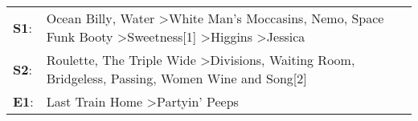 \begin{supertabular}{p{0.03\textwidth}p{0.92\textwidth}}
 \textbf{S1}:  &  Ocean Billy\textsuperscript{}, \enspace Water\textsuperscript{} \textgreater \enspace White Man's Moccasins\textsuperscript{}, \enspace Nemo\textsuperscript{}, \enspace Space Funk Booty\textsuperscript{} \textgreater \enspace Sweetness[1]\textsuperscript{} \textgreater \enspace Higgins\textsuperscript{} \textgreater \enspace Jessica\textsuperscript{}  \enspace  \\
 \textbf{S2}:  &                                                                   Roulette\textsuperscript{}, \enspace The Triple Wide\textsuperscript{} \textgreater \enspace Divisions\textsuperscript{}, \enspace Waiting Room\textsuperscript{}, \enspace Bridgeless\textsuperscript{}, \enspace Passing\textsuperscript{}, \enspace Women Wine and Song[2]\textsuperscript{}  \enspace  \\
 \textbf{E1}:  &                                                                                                                                                                                                                                                                          Last Train Home\textsuperscript{} \textgreater \enspace Partyin' Peeps\textsuperscript{}  \enspace  \\
\end{supertabular}
